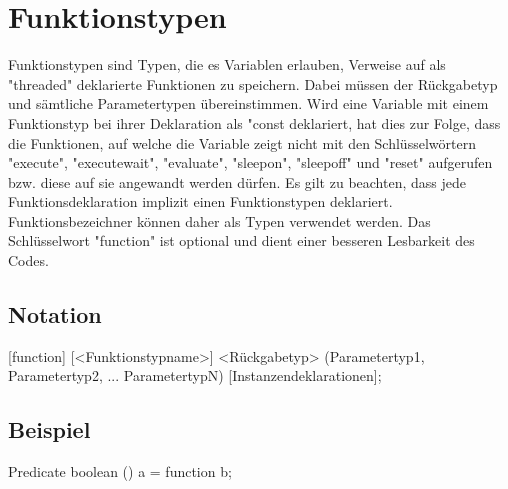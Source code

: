\chapter{Funktionstypen}

Funktionstypen sind Typen, die es Variablen erlauben, Verweise auf als "threaded" deklarierte Funktionen zu speichern.
Dabei müssen der Rückgabetyp und sämtliche Parametertypen übereinstimmen.
Wird eine Variable mit einem Funktionstyp bei ihrer Deklaration als "const deklariert, hat dies zur Folge, dass die Funktionen,
auf welche die Variable zeigt nicht mit den Schlüsselwörtern "execute", "executewait", "evaluate", "sleepon", "sleepoff" und "reset" aufgerufen
bzw. diese auf sie angewandt werden dürfen.
Es gilt zu beachten, dass jede Funktionsdeklaration implizit einen Funktionstypen deklariert. Funktionsbezeichner können daher als Typen
verwendet werden.
Das Schlüsselwort "function" ist optional und dient einer besseren Lesbarkeit des Codes.

\section{Notation}
[function] [<Funktionstypname>] <Rückgabetyp> (Parametertyp1, Parametertyp2, ... ParametertypN) [Instanzendeklarationen];

\section{Beispiel}
Predicate boolean () a = function b;